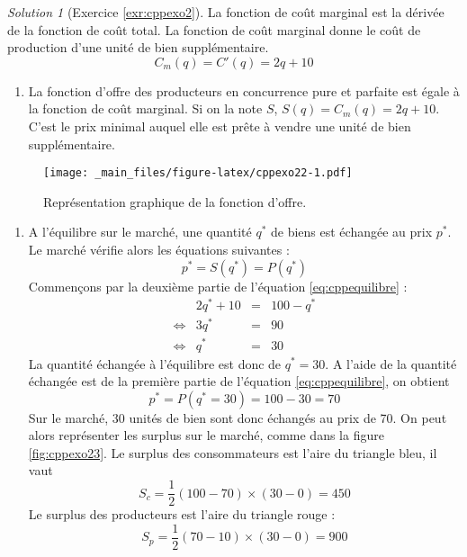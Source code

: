 \documentclass[
]{book}
\providecommand{\tightlist}{%
  \setlength{\itemsep}{0pt}\setlength{\parskip}{0pt}}
\theoremstyle{definition}
\theoremstyle{definition}
\theoremstyle{definition}
\theoremstyle{definition}
\theoremstyle{remark}
\newtheorem*{solution}{Solution}
\begin{document}
\begin{solution}[Exercice \ref{exr:cppexo2}]
La fonction de coût marginal est la dérivée de la fonction de coût total.
La fonction de coût marginal donne le coût de production d'une unité de bien supplémentaire.
\[C_m(q)=C'(q)=2q+10\]

\begin{enumerate}
\def\labelenumi{\arabic{enumi}.}
\setcounter{enumi}{1}
\tightlist
\item
  La fonction d'offre des producteurs en concurrence pure et parfaite est égale à la fonction de coût marginal.
  Si on la note \(S\), \(S(q)=C_m(q) = 2q+10\).
  C'est le prix minimal auquel elle est prête à vendre une unité de bien supplémentaire.
\end{enumerate}

\begin{figure}
\centering
\texttt{[image: \_main\_files/figure-latex/cppexo22-1.pdf]}
\caption{\label{fig:cppexo22}Représentation graphique de la fonction d'offre.}
\end{figure}

\begin{enumerate}
\def\labelenumi{\arabic{enumi}.}
\setcounter{enumi}{2}
\tightlist
\item
  A l'équilibre sur le marché, une quantité \(q^*\) de biens est échangée au prix \(p^*\).
  Le marché vérifie alors les équations suivantes :
  \begin{equation}
  p^*=S(q^*)=P(q^*)
  \label{eq:cppequilibre}
  \end{equation}
  Commençons par la deuxième partie de l'équation \eqref{eq:cppequilibre} :
  \[
  \begin{array}{crcl}
  &2q^*+10&=&100-q^*\\
  \Leftrightarrow&3q^*&=&90\\
  \Leftrightarrow & q^*&=&30
  \end{array}
  \]
  La quantité échangée à l'équilibre est donc de \(q^*=30\).
  A l'aide de la quantité échangée est de la première partie de l'équation \eqref{eq:cppequilibre}, on obtient
  \[
  p^*=P(q^*=30) = 100-30=70 
  \]
  Sur le marché, 30 unités de bien sont donc échangés au prix de 70.
  On peut alors représenter les surplus sur le marché, comme dans la figure \ref{fig:cppexo23}.
  Le surplus des consommateurs est l'aire du triangle bleu, il vaut
  \[S_c=\frac{1}{2}(100-70)\times(30-0)=450\]
  Le surplus des producteurs est l'aire du triangle rouge :
  \[
  S_p=\frac{1}{2}(70-10)\times(30-0) = 900
  \]
\end{enumerate}


\end{solution}
\end{document}
